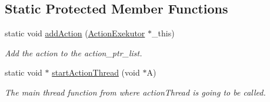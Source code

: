 \subsection*{\-Static \-Protected \-Member \-Functions}
\begin{DoxyCompactItemize}
\item 
static void \hyperlink{classexekutor_1_1ActionExekutor_ad2beec0ac18fbdaccf66fea31dbc9f69}{add\-Action} (\hyperlink{classexekutor_1_1ActionExekutor}{\-Action\-Exekutor} $\ast$\-\_\-this)
\begin{DoxyCompactList}\small\item\em \-Add the action to the action\-\_\-ptr\-\_\-list. \end{DoxyCompactList}\item 
static void $\ast$ \hyperlink{classexekutor_1_1ActionExekutor_a0637295658ad106f0ed3661be8f52c13}{start\-Action\-Thread} (void $\ast$\-A)
\begin{DoxyCompactList}\small\item\em \-The main thread function from where action\-Thread is going to be called. \end{DoxyCompactList}\end{DoxyCompactItemize}

